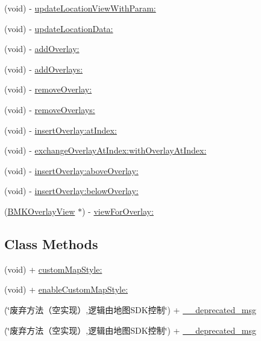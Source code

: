 \begin{DoxyCompactItemize}
\item 
(void) -\/ \hyperlink{interface_b_m_k_map_view_afc9842b45a41341b3ea5d2e632344382}{update\+Location\+View\+With\+Param\+:}
\item 
(void) -\/ \hyperlink{interface_b_m_k_map_view_a72c1c3b690379ecf804cc20ddf5840e9}{update\+Location\+Data\+:}
\item 
(void) -\/ \hyperlink{interface_b_m_k_map_view_af85ad6091568df29d9e7c3dea82a1a2b}{add\+Overlay\+:}
\item 
(void) -\/ \hyperlink{interface_b_m_k_map_view_ab7d29d948515cc6d947d6aa63f904168}{add\+Overlays\+:}
\item 
(void) -\/ \hyperlink{interface_b_m_k_map_view_a3be1f2a019df3ff971f6a36f142e55be}{remove\+Overlay\+:}
\item 
(void) -\/ \hyperlink{interface_b_m_k_map_view_a3eb7909fb1adce117c1de432fd5d816a}{remove\+Overlays\+:}
\item 
(void) -\/ \hyperlink{interface_b_m_k_map_view_adc0775a2651c1e4099f93d9c1bbffe3d}{insert\+Overlay\+:at\+Index\+:}
\item 
(void) -\/ \hyperlink{interface_b_m_k_map_view_a62c1c29b8e5b408ba0c40411a3c1f50f}{exchange\+Overlay\+At\+Index\+:with\+Overlay\+At\+Index\+:}
\item 
(void) -\/ \hyperlink{interface_b_m_k_map_view_ad94b45c4df7978e3a6095918323496d3}{insert\+Overlay\+:above\+Overlay\+:}
\item 
(void) -\/ \hyperlink{interface_b_m_k_map_view_a73dfe9f74d722b7b1fc477e791f34653}{insert\+Overlay\+:below\+Overlay\+:}
\item 
(\hyperlink{interface_b_m_k_overlay_view}{B\+M\+K\+Overlay\+View} $\ast$) -\/ \hyperlink{interface_b_m_k_map_view_aa88093440ad22f7af9cf9a36051f662d}{view\+For\+Overlay\+:}
\end{DoxyCompactItemize}
\subsection*{Class Methods}
\begin{DoxyCompactItemize}
\item 
(void) + \hyperlink{interface_b_m_k_map_view_a9ee0304b50e3fc0792caf0889ac3df20}{custom\+Map\+Style\+:}
\item 
(void) + \hyperlink{interface_b_m_k_map_view_abf961f56f5a898a9e0f90551f0741612}{enable\+Custom\+Map\+Style\+:}
\item 
(\char`\"{}废弃方法（空实现）,逻辑由地图\+S\+D\+K控制\char`\"{}) + \hyperlink{interface_b_m_k_map_view_a518bfe7f1570aa1c15459d2fa06087f6}{\+\_\+\+\_\+deprecated\+\_\+msg}
\item 
(\char`\"{}废弃方法（空实现）,逻辑由地图\+S\+D\+K控制\char`\"{}) + \hyperlink{interface_b_m_k_map_view_a518bfe7f1570aa1c15459d2fa06087f6}{\+\_\+\+\_\+deprecated\+\_\+msg}
\end{DoxyCompactItemize}
